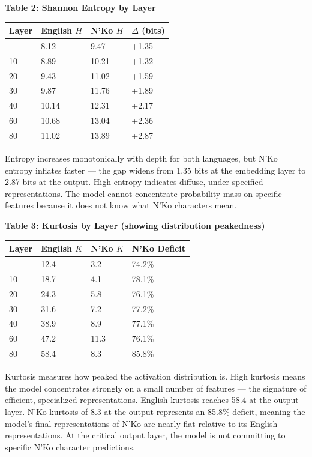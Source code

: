 \documentclass[
]{article}
\newcounter{none} %
\begin{document}
\textbf{Table 2: Shannon Entropy by Layer}

{\def\LTcaptype{none} %
\begin{longtable}[]{@{}llll@{}}
\toprule\noalign{}
Layer & English \(H\) & N'Ko \(H\) & \(\Delta\) (bits) \\
\midrule\noalign{}
\endhead
\bottomrule\noalign{}
\endlastfoot
0 & 8.12 & 9.47 & +1.35 \\
10 & 8.89 & 10.21 & +1.32 \\
20 & 9.43 & 11.02 & +1.59 \\
30 & 9.87 & 11.76 & +1.89 \\
40 & 10.14 & 12.31 & +2.17 \\
60 & 10.68 & 13.04 & +2.36 \\
80 & 11.02 & 13.89 & +2.87 \\
\end{longtable}
}

Entropy increases monotonically with depth for both languages, but N'Ko
entropy inflates faster --- the gap widens from 1.35 bits at the
embedding layer to 2.87 bits at the output. High entropy indicates
diffuse, under-specified representations. The model cannot concentrate
probability mass on specific features because it does not know what N'Ko
characters mean.

\textbf{Table 3: Kurtosis by Layer (showing distribution peakedness)}

{\def\LTcaptype{none} %
\begin{longtable}[]{@{}llll@{}}
\toprule\noalign{}
Layer & English \(K\) & N'Ko \(K\) & N'Ko Deficit \\
\midrule\noalign{}
\endhead
\bottomrule\noalign{}
\endlastfoot
0 & 12.4 & 3.2 & 74.2\% \\
10 & 18.7 & 4.1 & 78.1\% \\
20 & 24.3 & 5.8 & 76.1\% \\
30 & 31.6 & 7.2 & 77.2\% \\
40 & 38.9 & 8.9 & 77.1\% \\
60 & 47.2 & 11.3 & 76.1\% \\
80 & 58.4 & 8.3 & 85.8\% \\
\end{longtable}
}

Kurtosis measures how peaked the activation distribution is. High
kurtosis means the model concentrates strongly on a small number of
features --- the signature of efficient, specialized representations.
English kurtosis reaches 58.4 at the output layer. N'Ko kurtosis of 8.3
at the output represents an 85.8\% deficit, meaning the model's final
representations of N'Ko are nearly flat relative to its English
representations. At the critical output layer, the model is not
committing to specific N'Ko character predictions.
\end{document}
